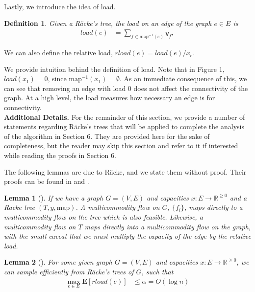 \documentclass[12pt]{article}
\newtheorem{definition}{Definition}
\newtheorem{lemma}{Lemma}
\begin{document}
Lastly, we introduce the idea of load.

\begin{definition}
Given a R\"{a}cke's tree, the load on an edge of the graph $e \in E$ is
\begin{align}
load(e) &= \sum_{f \in \text{map}^{-1}(e)} y_f,
\end{align}
\end{definition}
We can also define the relative load, $rload(e) = load(e)/x_e$.

We provide intuition behind the definition of load. Note that in Figure 1, $load(x_1) = 0$, since $\mathrm{map}^{-1}(x_1) = \emptyset$. As an immediate consequence of this, we can see that removing an edge with load 0 does not affect the connectivity of the graph. At a high level, the load measures how necessary an edge is for connectivity. \\
\noindent \textbf{Additional Details.} For the remainder of this section, we provide a number of statements regarding R\"{a}cke's trees that will be applied to complete the analysis of the algorithm in Section 6. They are provided here for the sake of completeness, but the reader may skip this section and refer to it if interested while reading the proofs in Section 6.

The following lemmas are due to R\"{a}cke, and we state them without proof. Their proofs can be found in \cite{racke} and \cite{ssc}.

\begin{lemma}[\cite{racke}]
\label{lem:mapflows}
If we have a graph $G = (V, E)$ and capacities $x: E \rightarrow \mathbb{R}^{\geq 0}$ and a Racke tree $(T, y, \text{map})$. A multicommodity flow on $G$, $\{ f_i \}$, maps directly to a multicommodity flow on the tree which is also feasible. Likewise, a multicommodity flow on $T$ maps directly into a multicommodity flow on the graph, with the small caveat that we must multiply the capacity of the edge by the relative load. 
\end{lemma}

\begin{lemma}[\cite{racke}]
\label{lem:rload}
For some given graph $G = (V, E)$ and capacities $x: E \rightarrow \mathbb{R}^{\geq 0}$, we can sample efficiently from R\"{a}cke's trees of $G$, such that 
\begin{align}
\max_{e \in E} \textbf{E}[rload(e)] &\leq \alpha = O(\log n) 
\end{align}
\end{lemma}
\end{document}
